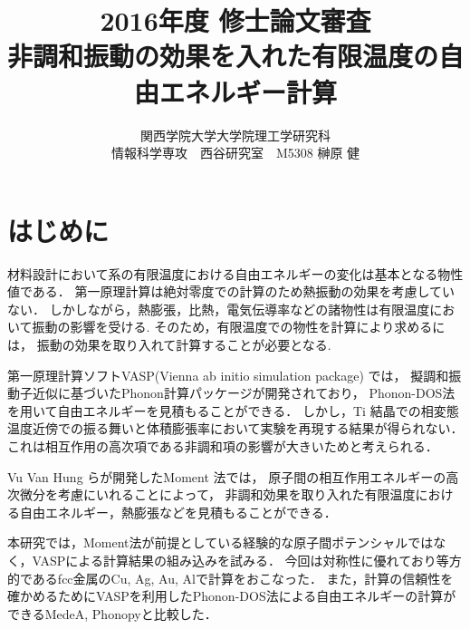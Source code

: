 \documentclass[10pt,twocolumn,a4j]{jsarticle}
\title{{\large2016年度 修士論文審査}\\非調和振動の効果を入れた有限温度の自由エネルギー計算}
\author{関西学院大学大学院理工学研究科\\情報科学専攻　西谷研究室　M5308 榊原 健}
\date{}
\begin{document}
\maketitle
\section{はじめに}
材料設計において系の有限温度における自由エネルギーの変化は基本となる物性値である．
第一原理計算は絶対零度での計算のため熱振動の効果を考慮していない．
しかしながら，熱膨張，比熱，電気伝導率などの諸物性は有限温度において振動の影響を受ける. 
そのため，有限温度での物性を計算により求めるには，
振動の効果を取り入れて計算することが必要となる.

第一原理計算ソフトVASP(Vienna ab initio simulation package) では，
擬調和振動子近似に基づいたPhonon計算パッケージが開発されており，
Phonon-DOS法を用いて自由エネルギーを見積もることができる\cite{phonon}．
しかし，Ti 結晶での相変態温度近傍での振る舞いと体積膨張率において実験を再現する結果が得られない\cite{kiyohara}．
これは相互作用の高次項である非調和項の影響が大きいためと考えられる．

Vu Van Hung らが開発したMoment 法では，
原子間の相互作用エネルギーの高次微分を考慮にいれることによって，
非調和効果を取り入れた有限温度における自由エネルギー，熱膨張などを見積もることができる\cite{jindo}．

本研究では，Moment法が前提としている経験的な原子間ポテンシャルではなく，VASPによる計算結果の組み込みを試みる．
今回は対称性に優れており等方的であるfcc金属のCu, Ag, Au, Alで計算をおこなった．
また，計算の信頼性を確かめるためにVASPを利用したPhonon-DOS法による自由エネルギーの計算ができるMedeA, Phonopyと比較した．

\end{document}

